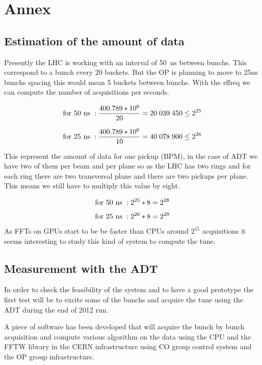 %

\chapter{Annex}

\section{Estimation of the amount of data}

Presently the \gls{LHC} is working with an interval of 50~ns between \glspl{bunch}. This correspond to a bunch every 20 \glspl{bucket}. But the \gls{OP} is planning to move to 25ns \glspl{bunch} spacing this would mean 5 \glspl{bucket} between \glspl{bunch}. With the \gls{rffreq} we can compute the number of acquisitions per seconds.

$${\rm for~}50{\rm ~ns}~: \frac{400.789*10^{6}}{20} = 20\;039\;450 \leq 2^{25}$$

$${\rm for~}25{\rm ~ns}~: \frac{400.789*10^{6}}{10} = 40\;078\;900 \leq 2^{26}$$ 

This represent the amount of data for one pickup (\gls{BPM}), in the case of \gls{ADT} we have two of them per beam and per plane so as the \gls{LHC} has two rings and for each ring there are two transversal plane and there are two pickups per plane. This means we still have to multiply this value by eight.

$${\rm for~}50{\rm ~ns}~: 2^{25} * 8 = 2^{28}$$

$${\rm for~}25{\rm ~ns}~: 2^{26} * 8 = 2^{29}$$

As \glspl{FFT} on \glspl{GPU} start to be be faster than \glspl{CPU} around $2^{15}$ acquisitions it seems interesting to study this kind of system to compute the \gls{tune}.

\section{Measurement with the ADT}

In order to check the feasibility of the system and to have a good prototype the first test will be to excite some of the \glspl{bunch} and acquire the \gls{tune} using the \gls{ADT} during the end of 2012 run\cite{Valuch12}.

A piece of software has been developed that will acquire the bunch by bunch acquisition and compute various algorithm on the data using the \gls{CPU} and the \gls{FFTW} library in the \gls{CERN} infrastructure using \gls{CO} group control system and the \gls{OP} group infrastructure.

